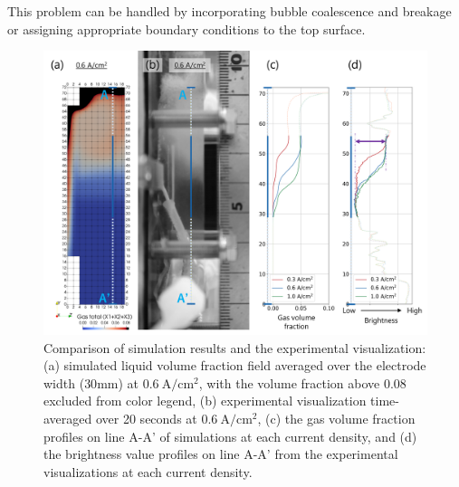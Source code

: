 \documentclass[3p, twocolumn, 10pt]{elsarticle}
\begin{document}
This problem can be handled by incorporating bubble coalescence and breakage or assigning appropriate boundary conditions to the top surface.
\begin{figure}[h]
  \centering
  \includegraphics[width=1\linewidth]{Untitled 7.png}
  \caption{Comparison of simulation results and the experimental visualization: (a) simulated liquid volume fraction field averaged over the electrode width ($30 \mathrm{mm}$) at $0.6\ \mathrm{A/cm^2}$, with the volume fraction above 0.08 excluded from color legend, (b) experimental visualization time-averaged over 20 seconds at $0.6\ \mathrm{A/cm^2}$, (c) the gas volume fraction profiles on line A-A' of simulations at each current density, and (d) the brightness value profiles on line A-A' from the experimental visualizations at each current density.}
  \label{fig:sidecomp}
\end{figure}
\end{document}
